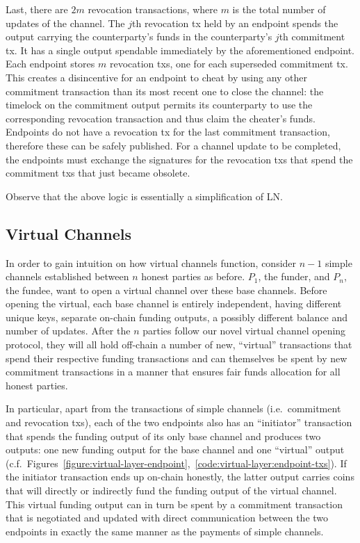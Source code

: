   Last, there are $2m$ revocation transactions, where $m$ is the total number of
  updates of the channel. The $j$th revocation tx held by an endpoint spends the
  output carrying the counterparty's funds in the counterparty's $j$th
  commitment tx. It has a single output spendable immediately by the
  aforementioned endpoint. Each endpoint stores $m$ revocation txs, one for each
  superseded commitment tx. This creates a disincentive for an endpoint to cheat
  by using any other commitment transaction than its most recent one to close
  the channel: the timelock on the commitment output permits its counterparty to
  use the corresponding revocation transaction and thus claim the cheater's
  funds.  Endpoints do not have a revocation tx for the last commitment
  transaction, therefore these can be safely published. For a channel update to
  be completed, the endpoints must exchange the signatures for the revocation
  txs that spend the commitment txs that just became obsolete.

  Observe that the above logic is essentially a simplification of LN.

\subsection{Virtual Channels}
  In order to gain intuition on how virtual channels function, consider $n-1$
  simple channels established between $n$ honest parties as before. $P_1$, the
  funder, and $P_n$, the fundee, want to open a virtual channel over these base
  channels.
  Before opening the virtual, each base channel is entirely independent, having
  different unique keys, separate on-chain funding outputs, a possibly different
  balance and number of updates. After the $n$ parties follow our novel virtual
  channel opening protocol, they will all hold off-chain a number of new,
  ``virtual'' transactions that spend their respective funding transactions and
  can themselves be spent by new commitment transactions in a manner that
  ensures fair funds allocation for all honest parties.

  In particular, apart from the transactions of simple channels (i.e.\
  commitment and revocation txs), each of the two
  endpoints also has an ``initiator'' transaction that spends the funding output
  of its only base channel and produces two outputs: one new funding output for
  the base channel and one ``virtual'' output (c.f.\
  Figures~\ref{figure:virtual-layer-endpoint},~\ref{code:virtual-layer:endpoint-txs}).
  If the initiator transaction ends up on-chain honestly, the latter output
  carries coins that will directly or indirectly fund the funding output of the
  virtual channel. This virtual funding output can in turn be spent by a
  commitment transaction that is negotiated and updated with direct
  communication between the two endpoints in exactly the same manner as the
  payments of simple channels.

